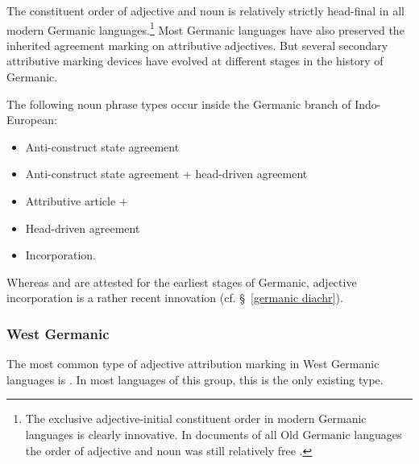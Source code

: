 The constituent order of adjective and noun is relatively strictly head-final in all modern Germanic languages.\footnote{The exclusive adjective-initial constituent order in modern Germanic languages is clearly innovative. In documents of all Old Germanic languages the order of adjective and noun was still relatively free \citep[cf.][]{heinrichs1954}.} Most Germanic languages have also preserved the inherited agreement marking on attributive adjectives. But several secondary attributive marking devices have evolved at different stages in the history of Germanic.

The following noun phrase types occur inside the Germanic branch of Indo-European:
\begin{itemize}
\item{Anti\hyp{}construct state agreement}
\item{Anti\hyp{}construct state agreement + head\hyp{}driven agreement}
\item{Attributive article + }
\item{Head\hyp{}driven agreement}
\item{Incorporation.}
\end{itemize}
Whereas  and  are attested for the earliest stages of Germanic, adjective incorporation is a rather recent innovation (cf. \S~\ref{germanic diachr}).

\subsubsection{West Germanic}\label{w-germanic synchr}
The most common type of adjective attribution marking in West Germanic languages is . In most languages of this group, this is the only existing type.

